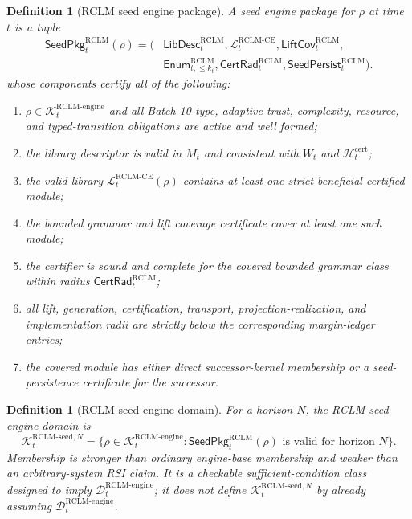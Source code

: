 \documentclass[11pt,a4paper]{article}
\newtheorem{definition}[theorem]{Definition}
\newcommand{\Lcal}{\mathcal L}
\newcommand{\Kcal}{\mathcal K}
\newcommand{\Dcal}{\mathcal D}
\newcommand{\RCLM}{\mathrm{RCLM}}
\newcommand{\cert}{\mathrm{cert}}
\newcommand{\engine}{\mathrm{engine}}
\newcommand{\CE}{\mathrm{CE}}
\begin{document}
\begin{definition}[RCLM seed engine package]
\label{def:rclm-batch11-seed-engine-package}
A seed engine package for \(\rho\) at time \(t\) is a tuple
\[
\begin{aligned}
\mathsf{SeedPkg}_t^{\RCLM}(\rho)=(&
\mathsf{LibDesc}_t^{\RCLM},
\Lcal_t^{\RCLM\text{-}\CE},
\mathsf{LiftCov}_t^{\RCLM},\\
&\mathsf{Enum}_{t,\le k_t}^{\RCLM},
\mathsf{CertRad}_t^{\RCLM},
\mathsf{SeedPersist}_t^{\RCLM}).
\end{aligned}
\]
whose components certify all of the following:
\begin{enumerate}[label=(\roman*),leftmargin=1.5em]
    \item \(\rho\in\Kcal_t^{\RCLM\text{-}\engine}\) and all Batch-10 type, adaptive-trust, complexity, resource, and typed-transition obligations are active and well formed;
    \item the library descriptor is valid in \(M_t\) and consistent with \(W_t\) and \(\mathcal H_t^{\cert}\);
    \item the valid library \(\Lcal_t^{\RCLM\text{-}\CE}(\rho)\) contains at least one strict beneficial certified module;
    \item the bounded grammar and lift coverage certificate cover at least one such module;
    \item the certifier is sound and complete for the covered bounded grammar class within radius \(\mathsf{CertRad}_t^{\RCLM}\);
    \item all lift, generation, certification, transport, projection-realization, and implementation radii are strictly below the corresponding margin-ledger entries;
    \item the covered module has either direct successor-kernel membership or a seed-persistence certificate for the successor.
\end{enumerate}
\end{definition}

\begin{definition}[RCLM seed engine domain]
\label{def:rclm-batch11-seed-engine-domain}
For a horizon \(N\), the RCLM seed engine domain is
\[
\boxed{
\Kcal_t^{\RCLM\text{-}\mathrm{seed},N}
=\{\rho\in\Kcal_t^{\RCLM\text{-}\engine}:
\mathsf{SeedPkg}_t^{\RCLM}(\rho)\text{ is valid for horizon }N\}.
}
\]
Membership is stronger than ordinary engine-base membership and weaker than an arbitrary-system RSI claim.  It is a checkable sufficient-condition class designed to imply \(\Dcal_t^{\RCLM\text{-}\engine}\); it does not define \(\Kcal_t^{\RCLM\text{-}\mathrm{seed},N}\) by already assuming \(\Dcal_t^{\RCLM\text{-}\engine}\).
\end{definition}
\end{document}
